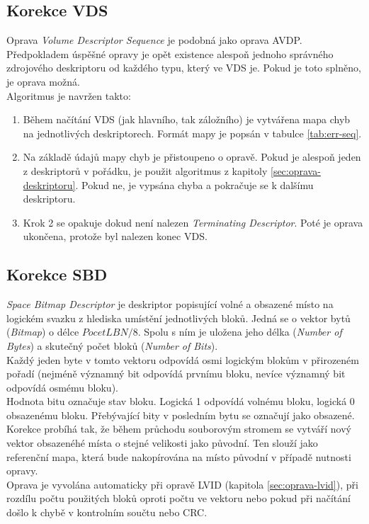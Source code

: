 \subsection{Korekce VDS}
\label{sec:oprava-vds}
Oprava \textit{Volume Descriptor Sequence} je podobná jako oprava AVDP. Předpokladem úspěšné opravy je opět existence alespoň jednoho správného zdrojového deskriptoru od každého typu, který ve VDS je. Pokud je toto splněno, je oprava možná.\\
Algoritmus je navržen takto:
\begin{enumerate}
    \item Během načítání VDS (jak hlavního, tak záložního) je vytvářena mapa chyb na jednotlivých deskriptorech. Formát mapy je popsán v tabulce \ref{tab:err-seq}. 
    \item Na základě údajů mapy chyb je přistoupeno o opravě. Pokud je alespoň jeden z deskriptorů v pořádku, je použit algoritmus z kapitoly \ref{sec:oprava-deskriptoru}. Pokud ne, je vypsána chyba a pokračuje se k dalšímu deskriptoru.
    \item Krok 2 se opakuje dokud není nalezen \textit{Terminating Descriptor}. Poté je oprava ukončena, protože byl nalezen konec VDS.
\end{enumerate}

\subsection{Korekce SBD}
\label{sec:oprava-sbd}
\textit{Space Bitmap Descriptor} je deskriptor popisující volné a obsazené místo na logickém svazku z hlediska umístění jednotlivých bloků. Jedná se o vektor bytů (\textit{Bitmap}) o délce $PocetLBN / 8$. Spolu s ním je uložena jeho délka (\textit{Number of Bytes}) a skutečný počet bloků (\textit{Number of Bits}).\\ 
Každý jeden byte v tomto vektoru odpovídá osmi logickým blokům v přirozeném pořadí (nejméně významný bit odpovídá prvnímu bloku, nevíce významný bit odpovídá osmému bloku).\\
Hodnota bitu označuje stav bloku. Logická 1 odpovídá volnému bloku, logická 0 obsazenému bloku. Přebývající bity v posledním bytu se označují jako obsazené.\\
Korekce probíhá tak, že během průchodu souborovým stromem se vytváří nový vektor obsazenéhé místa o stejné velikosti jako původní. Ten slouží jako referenční mapa, která bude nakopírována na místo původní v případě nutnosti opravy.\\
Oprava je vyvolána automaticky při opravě LVID (kapitola \ref{sec:oprava-lvid}), při rozdílu počtu použitých bloků oproti počtu ve vektoru nebo pokud při načítání došlo k chybě v kontrolním součtu nebo CRC.

